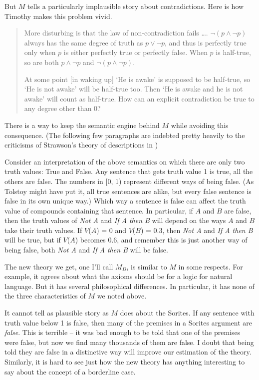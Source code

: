 But \(M\) tells a particularly implausible story about contradictions. Here is how Timothy \citet{Williamson1994-WILV} makes this problem vivid.

\begin{quote}
More disturbing is that the law of non-contradiction fails {\dots}. \(\neg(p \wedge \neg p)\)  always has the same degree of truth as \(p \vee \neg p\), and thus is perfectly true only when \(p\) is either perfectly true or perfectly false. When \(p\) is half-true, so are both \(p \wedge \neg p\) and \(\neg(p \wedge \neg p)\). \cite[118]{Williamson1994-WILV} 

At some point [in waking up] `He is awake' is supposed to be half-true, so `He is not awake' will be half-true too. Then `He is awake and he is not awake' will count as half-true. How can an explicit contradiction be true to any degree other than 0? \cite[136]{Williamson1994-WILV} 
\end{quote}

\noindent There is a way to keep the semantic engine behind \(M\) while avoiding this consequence. (The following few paragraphs are indebted pretty heavily to the criticisms of Strawson's theory of descriptions in \citet{Dummett1959})

Consider an interpretation of the above semantics on which there are only two truth values: True and False. Any sentence that gets truth value 1 is true, all the others are false. The numbers in [0, 1) represent different ways of being false. (As Tolstoy might have put it, all true sentences are alike, but every false sentence is false in its own unique way.) Which way a sentence is false can affect the truth value of compounds containing that sentence. In particular, if \(A\) and \(B\) are false, then the truth values of \textit{Not A} and \textit{If A then B} will depend on the ways \(A\) and \(B\) take their truth values. If \(V\)(\(A\)) = 0 and \(V\)(\(B\)) = 0.3, then \textit{Not A} and \textit{If A then B} will be true, but if \(V\)(\(A\)) becomes 0.6, and remember this is just another way of being false, both \textit{Not A} and \textit{If A then B} will be false.

The new theory we get, one I'll call \(M_D\), is similar to \(M\) in some respects. For example, it agrees about what the axioms should be for a logic for natural language. But it has several philosophical differences. In particular, it has none of the three characteristics of \(M\) we noted above. 

It cannot tell as plausible story as \(M\) does about the Sorites. If any sentence with truth value below 1 is false, then many of the premises in a Sorites argument are \textit{false}. This is terrible -- it was bad enough to be told that one of the premises were false, but now we find many thousands of them are false. I doubt that being told they are false in a distinctive way will improve our estimation of the theory. Similarly, it is hard to see just how the new theory has anything interesting to say about the concept of a borderline case. 

